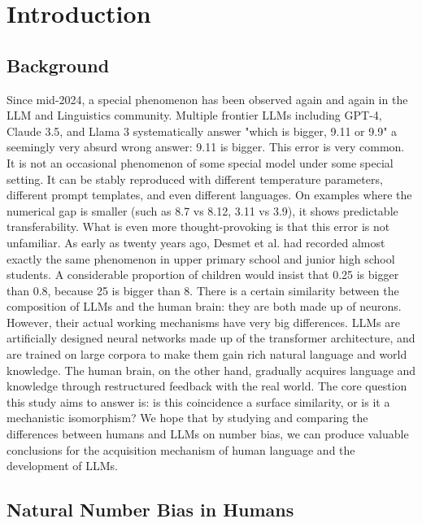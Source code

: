\cleardoublepage

\section{Introduction}

\subsection{Background}

Since mid-2024, a special phenomenon has been observed again and again in the LLM and Linguistics community. Multiple frontier LLMs including GPT-4, Claude 3.5, and Llama 3 systematically answer "which is bigger, 9.11 or 9.9" a seemingly very absurd wrong answer: 9.11 is bigger\cite{singh2024, eval16x2025}. This error is very common. It is not an occasional phenomenon of some special model under some special setting. It can be stably reproduced with different temperature parameters, different prompt templates, and even different languages. On examples where the numerical gap is smaller (such as 8.7 vs 8.12, 3.11 vs 3.9), it shows predictable transferability. What is even more thought-provoking is that this error is not unfamiliar. As early as twenty years ago, Desmet et al.\cite{desmet2010} had recorded almost exactly the same phenomenon in upper primary school and junior high school students. A considerable proportion of children would insist that 0.25 is bigger than 0.8, because 25 is bigger than 8. There is a certain similarity between the composition of LLMs and the human brain: they are both made up of neurons. However, their actual working mechanisms have very big differences. LLMs are artificially designed neural networks made up of the transformer architecture, and are trained on large corpora to make them gain rich natural language and world knowledge. The human brain, on the other hand, gradually acquires language and knowledge through restructured feedback with the real world. The core question this study aims to answer is: is this coincidence a surface similarity, or is it a mechanistic isomorphism? We hope that by studying and comparing the differences between humans and LLMs on number bias, we can produce valuable conclusions for the acquisition mechanism of human language and the development of LLMs.

\subsection{Natural Number Bias in Humans}

